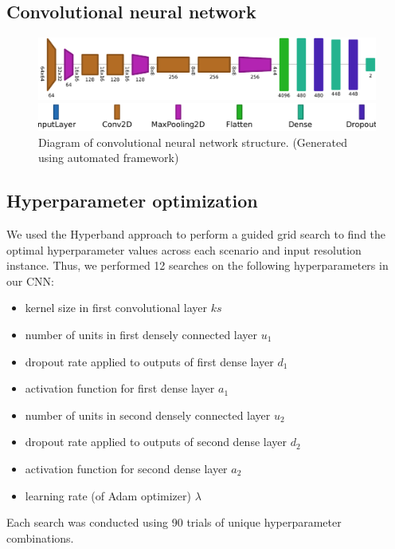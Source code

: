 \documentclass[Journal,letterpaper, SingleSpace, InsideFigs]{ascelike-new}
\begin{document}
\subsection{Convolutional neural network}


\begin{figure}
    \centering
    \includegraphics[width=.9\textwidth]{net2vis/graph.pdf}
    \medskip
    
    \includegraphics[width=.7\textwidth]{figures/net2vis-name-labels/legend}
    \caption{Diagram of convolutional neural network structure. (Generated using automated framework)}
    \label{fig:my_label}
\end{figure}

\subsection{Hyperparameter optimization}
We used the Hyperband approach \cite{li2018hyperband} to perform a guided grid search to find the optimal hyperparameter values across each scenario and input resolution instance. Thus, we performed 12 searches on the following hyperparameters in our CNN:
\begin{itemize}
    \item kernel size in first convolutional layer $ks$
    \item number of units in first densely connected layer $u_1$
    \item dropout rate applied to outputs of first dense layer $d_1$
    \item activation function for first dense layer $a_1$
    \item number of units in second densely connected layer $u_2$
    \item dropout rate applied to outputs of second dense layer $d_2$
    \item activation function for second dense layer $a_2$
    \item learning rate (of Adam optimizer) $\lambda$
\end{itemize}
Each search was conducted using 90 trials of unique hyperparameter combinations.
\end{document}
